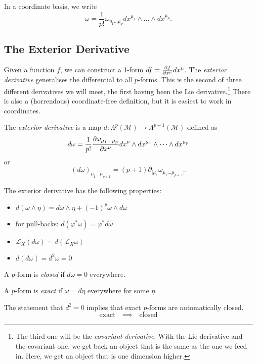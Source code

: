 In a coordinate basis, we write
\begin{equation}
  \omega = \frac{1}{p!} \omega_{\eta_1 \dots \mu_p} dx^{\mu_1} \wedge \dots \wedge dx^{\mu_p}.
\end{equation}

\subsection{The Exterior Derivative}%
\label{sub:the_exterior_derivative}

Given a function $f$, we can construct a 1-form $ df = \pdv{f}{x^\mu} dx^\mu$.
The \emph{exterior derivative} generalises the differential to all $p$-forms. This is the second of three different derivatives we will meet, the first having been the Lie derivative.\footnote{The third one will be the \emph{covariant derivative}. With the Lie derivative and the covariant one, we get back an object that is the same as the one we feed in. Here, we get an object that is one dimension higher.}
There is also a (horrendous) coordinate-free definition, but it is easiest to work in coordinates.

\begin{definition}[]
  The \emph{exterior derivative} is a map $d: \Lambda^p(\mathcal{M}) \to \Lambda^{p+1}(\mathcal{M})$ defined as
  \begin{equation}
    d\omega = \frac{1}{p!} \pdv{\omega_{\mu_1 \dots \mu_p}}{x^\nu} dx^\nu \wedge dx^{\mu_1} \wedge \dots \wedge dx^{\mu_p}
  \end{equation}
  or
  \begin{equation}
    (d\omega)_{\mu_1 \dots \mu_{p+1}} = (p+1) \partial_{[\mu_1} \omega_{\mu_2 \dots \mu_{p+1}]}.
  \end{equation}
\end{definition}
\begin{claim}
  The exterior derivative has the following properties:
  \begin{itemize}
    \item $d(\omega \wedge\eta) = d\omega \wedge \eta + (-1)^p \omega \wedge d \omega$
    \item for pull-backs: $d(\varphi^* \omega) = \varphi^* d\omega$
    \item $\mathcal{L}_X (d\omega) = d(\mathcal{L}_X \omega)$
    \item $d(d\omega) = d^2 \omega = 0$
  \end{itemize}
\end{claim}
\begin{definition}[]
  A $p$-form is \emph{closed} if $d\omega =0$ everywhere.
\end{definition}
\begin{definition}[]
  A $p$-form is \emph{exact} if $\omega = d\eta$ everywhere for some $\eta$.
\end{definition}
\begin{corollary}
  The statement that $d^2 = 0$ implies that exact $p$-forms are automatically closed.
  \begin{equation}
    \text{exact} \quad \implies \quad \text{closed}
  \end{equation}
\end{corollary}

